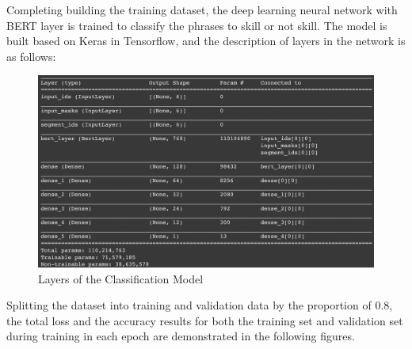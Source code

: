 Completing building the training dataset, the deep learning neural network with BERT layer is trained to classify the phrases to skill or not skill. The model is built based on Keras in Tensorflow, and the description of layers in the network is as follows:

 \begin{figure}[H]
    \centering
    \includegraphics[width=1.0\textwidth]{images/layers_bert.png}
    \caption{Layers of the Classification Model}
    \label{fig:33}
\end{figure}

Splitting the dataset into training and validation data by the proportion of 0.8, the total loss and the accuracy results for both the training set and validation set during training in each epoch are demonstrated in the following figures.

